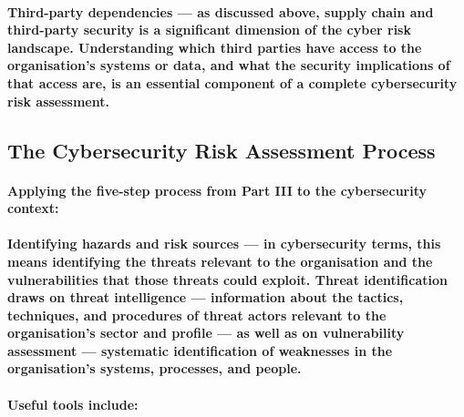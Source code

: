 \paragraph{\textbf{Third-party dependencies} — as discussed above, supply chain and third-party security is a significant dimension of the cyber risk landscape. Understanding which third parties have access to the organisation's systems or data, and what the security implications of that access are, is an essential component of a complete cybersecurity risk assessment.}

\subsection{The Cybersecurity Risk Assessment Process}
\paragraph{Applying the five-step process from Part III to the cybersecurity context:}
\paragraph{\textbf{Identifying hazards and risk sources} — in cybersecurity terms, this means identifying the threats relevant to the organisation and the vulnerabilities that those threats could exploit. Threat identification draws on threat intelligence — information about the tactics, techniques, and procedures of threat actors relevant to the organisation's sector and profile — as well as on vulnerability assessment — systematic identification of weaknesses in the organisation's systems, processes, and people.}
\paragraph{Useful tools include:}
\begin{itemize}
\end{itemize}
